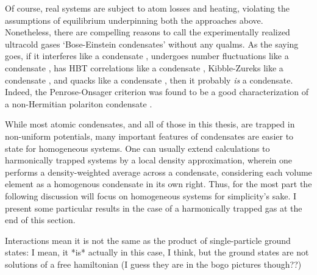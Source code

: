 	Of course, real systems are subject to atom losses and heating, violating the assumptions of equilibrium underpinning both the approaches above.
	Nonetheless, there are compelling reasons to call the experimentally realized ultracold gases `Bose-Einstein condensates' without any qualms.
	As the saying goes, if it interferes like a condensate \cite{andrews97} , undergoes number fluctuations like a condensate \cite{kristensen19},  has HBT correlations like a condensate \cite{schellekens05,jeltes07}, Kibble-Zureks like a condensate \cite{anquez16}, and quacks like a condensate \cite{duck01}, then it probably \emph{is} a condensate.
	Indeed, the Penrose-Onsager criterion was found to be a good characterization of a non-Hermitian polariton condensate \cite{manni12}.

	While most atomic condensates, and all of those in this thesis, are trapped in non-uniform potentials, many important features of condensates are easier to state for homogeneous systems.
	One can usually extend calculations to harmonically trapped systems by a local density approximation, wherein one performs a density-weighted average across a condensate, considering each volume element as a homogenous condensate in its own right.
	Thus, for the most part the following discussion will focus on homogeneous systems for simplicity's sake.
	I present some particular results in the case of a harmonically trapped gas at the end of this section.

	Interactions mean it is not the same as the product of single-particle ground states: I mean, it *is* actually in this case, I think, but the ground states are not solutions of a free hamiltonian (I guess they are in the bogo pictures though??)


	
	
